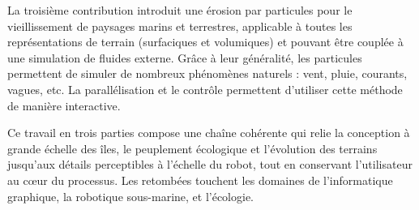 La troisième contribution introduit une érosion par particules pour le vieillissement de paysages marins et terrestres, applicable à toutes les représentations de terrain (surfaciques et volumiques) et pouvant être couplée à une simulation de fluides externe. Grâce à leur généralité, les particules permettent de simuler de nombreux phénomènes naturels : vent, pluie, courants, vagues, etc. La parallélisation et le contrôle permettent d'utiliser cette méthode de manière interactive.

Ce travail en trois parties compose une chaîne cohérente qui relie la conception à grande échelle des îles, le peuplement écologique et l'évolution des terrains jusqu'aux détails perceptibles à l'échelle du robot, tout en conservant l'utilisateur au cœur du processus. Les retombées touchent les domaines de l'informatique graphique, la robotique sous-marine, et l'écologie.




































